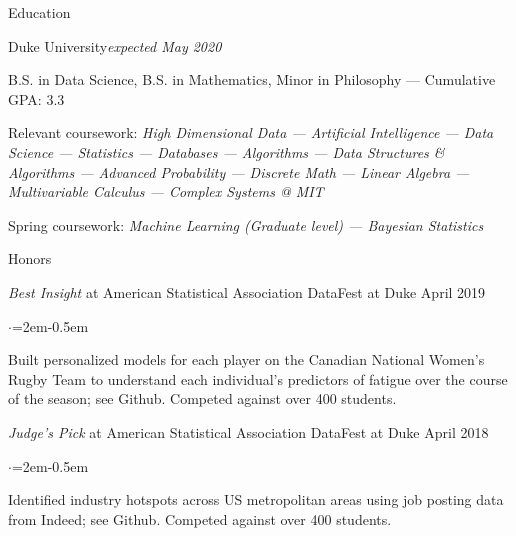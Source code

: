 \documentclass{resume} %
\begin{document}

\begin{rSection}{Education}

\begin{rSubsection}{Duke University}{\em expected May 2020}{}
\item  B.S. in Data Science, B.S. in Mathematics, Minor in Philosophy --- Cumulative GPA: 3.3
\item  Relevant coursework: {\em High Dimensional Data --- Artificial Intelligence --- Data Science --- Statistics --- Databases --- Algorithms --- Data Structures \& Algorithms --- Advanced Probability ---  Discrete Math  --- Linear Algebra --- Multivariable Calculus --- Complex Systems @ MIT}
\item Spring coursework: {\em Machine Learning (Graduate level) --- Bayesian Statistics}
\end{rSubsection}



\begin{rSubsection}{Honors}{}{}{}
	\item \textit{Best Insight} at American Statistical Association DataFest at Duke \hfill {April 2019}
		\begin{list}{$\cdot$}{\leftmargin=2em}\itemsep -0.5em \vspace{-0.5em}
			\item Built personalized models for each player on the Canadian National Women's Rugby Team to understand each individual's predictors of fatigue over the course of the season; see Github. Competed against over 400 students.
		\end{list}
	\item \textit{Judge's Pick} at American Statistical Association DataFest at Duke \hfill {April 2018}
	\begin{list}{$\cdot$}{\leftmargin=2em}\itemsep -0.5em \vspace{-0.5em}
			\item Identified industry hotspots across US metropolitan areas using job posting data from Indeed; see Github. Competed against over 400 students.
		\end{list}

\end{rSubsection}

\end{rSection}
\end{document}
